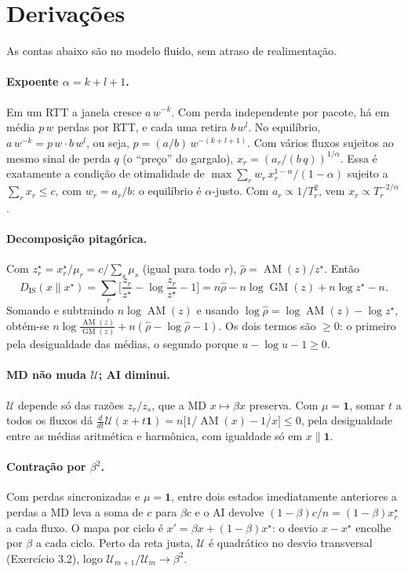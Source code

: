 \documentclass[11pt,a4paper]{article}
\newcommand{\AM}{\operatorname{AM}}
\newcommand{\GM}{\operatorname{GM}}
\newcommand{\Dis}{D_{\mathrm{IS}}}
\newcommand{\ones}{\mathbf{1}}
\begin{document}
\section{Derivações}
\label{app:deriv}

As contas abaixo são no modelo fluido, sem atraso de realimentação.

\paragraph{Expoente $\alpha=k+l+1$.} Em um RTT a janela cresce $a\,w^{-k}$. Com perda
independente por pacote, há em média $p\,w$ perdas por RTT, e cada uma retira $b\,w^{l}$.
No equilíbrio, $a\,w^{-k}=p\,w\cdot b\,w^{l}$, ou seja, $p=(a/b)\,w^{-(k+l+1)}$. Com vários
fluxos sujeitos ao mesmo sinal de perda $q$ (o “preço” do gargalo),
$x_r=(a_r/(b\,q))^{1/\alpha}$. Essa é exatamente a condição de otimalidade de
$\max\sum_r w_r\,x_r^{1-\alpha}/(1-\alpha)$ sujeito a $\sum_r x_r\le c$, com $w_r=a_r/b$:
o equilíbrio é $\alpha$-justo. Com $a_r\propto1/T_r^2$, vem $x_r\propto T_r^{-2/\alpha}$.

\paragraph{Decomposição pitagórica.} Com $z^\star_r=x^\star_r/\mu_r=c/\sum_s\mu_s$ (igual
para todo $r$), $\hat\rho=\AM(z)/z^\star$. Então
\[
\Dis(x\|x^\star)=\sum_r\Big[\frac{z_r}{z^\star}-\log\frac{z_r}{z^\star}-1\Big]
=n\hat\rho-n\log\GM(z)+n\log z^\star-n .
\]
Somando e subtraindo $n\log\AM(z)$ e usando $\log\hat\rho=\log\AM(z)-\log z^\star$,
obtém-se $n\log\frac{\AM(z)}{\GM(z)}+n(\hat\rho-\log\hat\rho-1)$. Os dois termos são
$\ge0$: o primeiro pela desigualdade das médias, o segundo porque
$u-\log u-1\ge0$.

\paragraph{MD não muda $\mathcal U$; AI diminui.} $\mathcal U$ depende só das razões
$z_r/z_s$, que a MD $x\mapsto\beta x$ preserva. Com $\mu=\ones$, somar $t$ a todos os
fluxos dá $\frac{d}{dt}\mathcal U(x+t\ones)=n\big[1/\AM(x)-\overline{1/x}\big]\le0$,
pela desigualdade entre as médias aritmética e harmônica, com igualdade só em
$x\parallel\ones$.

\paragraph{Contração por $\beta^2$.} Com perdas sincronizadas e $\mu=\ones$, entre dois
estados imediatamente anteriores a perdas a MD leva a soma de $c$ para $\beta c$ e o AI
devolve $(1-\beta)c/n=(1-\beta)x^\star_r$ a cada fluxo. O mapa por ciclo é
$x'=\beta x+(1-\beta)x^\star$: o desvio $x-x^\star$ encolhe por $\beta$ a cada ciclo. Perto
da reta justa, $\mathcal U$ é quadrático no desvio transversal (Exercício 3.2), logo
$\mathcal U_{m+1}/\mathcal U_m\to\beta^2$.
\end{document}
